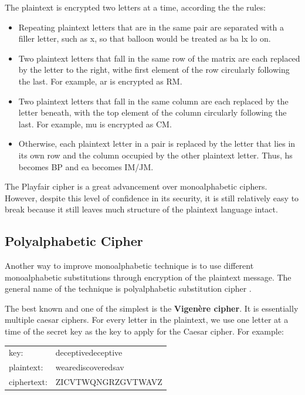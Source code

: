 \documentclass{article}
\begin{document}
The plaintext is encrypted two letters at a time, according the the rules:
\begin{itemize}
\item Repeating plaintext letters that are in the same pair are separated with a filler letter, such as x, so that balloon would be treated as ba lx lo on.
\item Two plaintext letters that fall in the same row of the matrix are each replaced by the letter to the right, withe first element of the row circularly following the last. For example, ar is encrypted as RM.
\item Two plaintext letters that fall in the same column are each replaced by the letter beneath, with the top element of the column circularly following the last. For example, mu is encrypted as CM.
\item Otherwise, each plaintext letter in a pair is replaced by the letter that lies in its own row and the column occupied by the other plaintext letter. Thus, hs becomes BP and ea becomes IM/JM.
\end{itemize}

The Playfair cipher is a great advancement over monoalphabetic ciphers. However, despite this level of confidence in its security, it is still relatively easy to break because it still leaves much structure of the plaintext language intact.

\subsection{Polyalphabetic Cipher}
Another way to improve monoalphabetic technique is to use different monoalphabetic substitutions through encryption of the plaintext message. The general name of the technique is polyalphabetic substitution cipher \cite{stallings2011}.

The best known and one of the simplest is the \textbf{Vigen\`{e}re cipher}. It is essentially multiple caesar ciphers. For every letter in the plaintext, we use one letter at a time of the secret key as the key to apply for the Caesar cipher. For example:
\\

\begin{tabular}{l l}
key: & deceptivedeceptive\\
plaintext: & wearediscoveredsav\\
ciphertext: & ZICVTWQNGRZGVTWAVZ\\
\end{tabular}
\\
\end{document}
